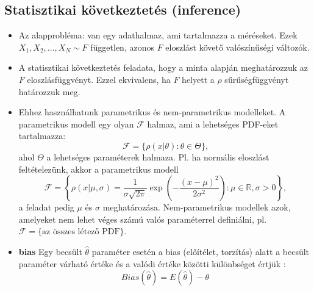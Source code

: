 \documentclass[12pt]{article}
\theoremstyle{plain}
\begin{document}
\subsection{Statisztikai következtetés (inference)}
\begin{itemize}
    \item Az alapprobléma: van egy adathalmaz, ami tartalmazza a méréseket. Ezek $X_1, X_2, ..., X_N \sim F$ független, 
    azonos $F$ eloszlást követő valószínűségi változók.
    \item A statisztikai következtetés feladata, hogy a minta alapján meghatározzuk az $F$ eloszlásfüggvényt. Ezzel ekvivalens,
    ha $F$ helyett a $\rho$ sűrűségfüggvényt határozzuk meg.
    \item Ehhez használhatunk parametrikus és nem-parametrikus modelleket. A parametrikus modell egy olyan $\mathcal F$ halmaz, 
    ami a lehetséges PDF-eket tartalmazza:
    \begin{equation*}
        \mathcal F = \{\rho(x|\theta) : \theta \in \Theta\}\text{,}
    \end{equation*}
    ahol $\Theta$ a lehetséges paraméterek halmaza. Pl. ha normális eloszlást feltételezünk, akkor a parametrikus modell
    \begin{equation*}
        \mathcal F = \left\{\rho(x|\mu, \sigma) = \frac{1}{\sigma\sqrt{2\pi}}\exp\left(-\frac{(x-\mu)^2}{2\sigma^2}\right) : \mu\in\mathbb R, \sigma>0 \right\}\text{,}
    \end{equation*}
    a feladat pedig $\mu$ és $\sigma$ meghatározása. Nem-parametrikus modellek azok, amelyeket nem lehet véges számú valós paraméterrel
    definiálni, pl. $\mathcal F = \{\text{az összes létező PDF}\}$.
    \item \textbf{bias} Egy becsült $\hat\theta$ paraméter esetén a bias (előítélet, torzítás) alatt a becsült paraméter
    várható értéke és a valódi értéke közötti különbséget értjük \cite{biaswiki}: 
    \begin{equation*}
        Bias(\hat\theta) = E(\hat\theta) - \theta 
    \end{equation*}
\end{itemize}
\end{document}
